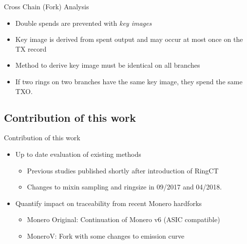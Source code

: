 \begin{frame}{Cross Chain (Fork) Analysis}
\begin{itemize}[<+->]
		\item Double spends are prevented with \emph{key images}
		\item Key image is derived from spent output and may occur at most once on the TX record
		\item Method to derive key image must be identical on all branches
		\item If two rings on two branches have the same key image, they spend the same TXO. 
\end{itemize}
\end{frame}

\subsection{Contribution of this work}
\begin{frame}{Contribution of this work}
	\begin{itemize}
		\item Up to date evaluation of existing methods
		\begin{itemize}
			\item Previous studies published shortly after introduction of RingCT
			\item Changes to mixin sampling and ringsize in 09/2017 and 04/2018.
		\end{itemize}
		\item Quantify impact on traceability from recent Monero hardforks \begin{itemize}
			\item Monero Original: Continuation of Monero v6 (ASIC compatible)
			\item MoneroV: Fork with some changes to emission curve
		\end{itemize}
	\end{itemize}
\end{frame}

